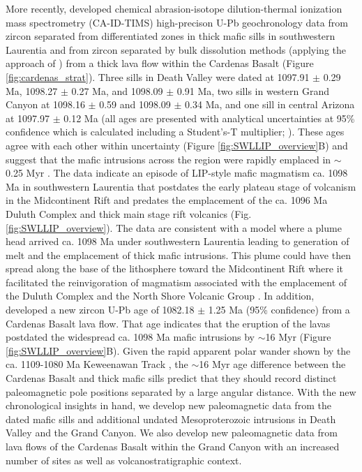 More recently, \cite{Mohr2024a} developed chemical abrasion-isotope dilution-thermal ionization mass spectrometry (CA-ID-TIMS) high-precison U-Pb geochronology data from zircon separated from differentiated zones in thick mafic sills in southwestern Laurentia and from zircon separated by bulk dissolution methods (applying the approach of \cite{Oliveira2022a}) from a thick lava flow within the Cardenas Basalt (Figure \ref{fig:cardenas_strat}). Three sills in Death Valley were dated at 1097.91 $\pm$ 0.29 Ma, 1098.27 $\pm$ 0.27 Ma, and 1098.09 $\pm$ 0.91 Ma, two sills in western Grand Canyon at 1098.16 $\pm$ 0.59 and 1098.09 $\pm$ 0.34 Ma, and one sill in central Arizona at 1097.97 $\pm$ 0.12 Ma (all ages are presented with analytical uncertainties at 95\% confidence which is calculated including a Student’s-T multiplier; \citealp{Mohr2024a}). These ages agree with each other within uncertainty (Figure \ref{fig:SWLLIP_overview}B) and suggest that the mafic intrusions across the region were rapidly emplaced in $\sim$0.25 Myr \citep{Mohr2024a}. The data indicate an episode of LIP-style mafic magmatism ca. 1098 Ma in southwestern Laurentia that postdates the early plateau stage of volcanism in the Midcontinent Rift and predates the emplacement of the ca. 1096 Ma Duluth Complex and thick main stage rift volcanics (Fig. \ref{fig:SWLLIP_overview}). The data are consistent with a model where a plume head arrived ca. 1098 Ma under southwestern Laurentia leading to generation of melt and the emplacement of thick mafic intrusions. This plume could have then spread along the base of the lithosphere toward the Midcontinent Rift where it facilitated the reinvigoration of magmatism associated with the emplacement of the Duluth Complex and the North Shore Volcanic Group \citep{Mohr2024a}. In addition, \cite{Mohr2024a} developed a new zircon U-Pb age of 1082.18 $\pm$ 1.25 Ma (95\% confidence) from a Cardenas Basalt lava flow. That age indicates that the eruption of the lavas postdated the widespread ca. 1098 Ma mafic intrusions by $\sim$16 Myr (Figure \ref{fig:SWLLIP_overview}B). Given the rapid apparent polar wander shown by the ca. 1109-1080 Ma Keweenawan Track \citep{Swanson-Hysell2019a}, the $\sim$16 Myr age difference between the Cardenas Basalt and thick mafic sills predict that they should record distinct paleomagnetic pole positions separated by a large angular distance. With the new chronological insights in hand, we develop new paleomagnetic data from the dated mafic sills and additional undated Mesoproterozoic intrusions in Death Valley and the Grand Canyon. We also develop new paleomagnetic data from lava flows of the Cardenas Basalt within the Grand Canyon with an increased number of sites as well as volcanostratigraphic context. 

